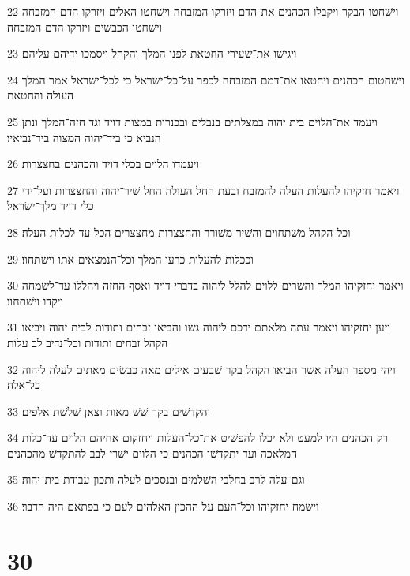 \par 22 וישׁחטו הבקר ויקבלו הכהנים את־הדם ויזרקו המזבחה וישׁחטו האלים ויזרקו הדם המזבחה וישׁחטו הכבשׂים ויזרקו הדם המזבחה׃
\par 23 ויגישׁו את־שׂעירי החטאת לפני המלך והקהל ויסמכו ידיהם עליהם׃
\par 24 וישׁחטום הכהנים ויחטאו את־דמם המזבחה לכפר על־כל־ישׂראל כי לכל־ישׂראל אמר המלך העולה והחטאת׃
\par 25 ויעמד את־הלוים בית יהוה במצלתים בנבלים ובכנרות במצות דויד וגד חזה־המלך ונתן הנביא כי ביד־יהוה המצוה ביד־נביאיו׃
\par 26 ויעמדו הלוים בכלי דויד והכהנים בחצצרות׃
\par 27 ויאמר חזקיהו להעלות העלה להמזבח ובעת החל העולה החל שׁיר־יהוה והחצצרות ועל־ידי כלי דויד מלך־ישׂראל׃
\par 28 וכל־הקהל משׁתחוים והשׁיר משׁורר והחצצרות מחצצרים הכל עד לכלות העלה׃
\par 29 וככלות להעלות כרעו המלך וכל־הנמצאים אתו וישׁתחוו׃
\par 30 ויאמר יחזקיהו המלך והשׂרים ללוים להלל ליהוה בדברי דויד ואסף החזה ויהללו עד־לשׂמחה ויקדו וישׁתחוו׃
\par 31 ויען יחזקיהו ויאמר עתה מלאתם ידכם ליהוה גשׁו והביאו זבחים ותודות לבית יהוה ויביאו הקהל זבחים ותודות וכל־נדיב לב עלות׃
\par 32 ויהי מספר העלה אשׁר הביאו הקהל בקר שׁבעים אילים מאה כבשׂים מאתים לעלה ליהוה כל־אלה׃
\par 33 והקדשׁים בקר שׁשׁ מאות וצאן שׁלשׁת אלפים׃
\par 34 רק הכהנים היו למעט ולא יכלו להפשׁיט את־כל־העלות ויחזקום אחיהם הלוים עד־כלות המלאכה ועד יתקדשׁו הכהנים כי הלוים ישׁרי לבב להתקדשׁ מהכהנים׃
\par 35 וגם־עלה לרב בחלבי השׁלמים ובנסכים לעלה ותכון עבודת בית־יהוה׃
\par 36 וישׂמח יחזקיהו וכל־העם על ההכין האלהים לעם כי בפתאם היה הדבר׃

\chapter{30}

